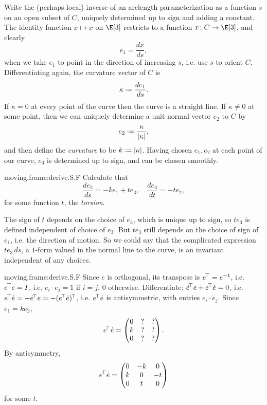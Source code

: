 Write the (perhaps local) inverse of an arclength parameterization as a function \(s\) on an open subset of \(C\), uniquely determined up to sign and adding a constant.
The identity function \(x \mapsto x\) on \(\E[3]\) restricts to a function \(x \colon C \to \E[3]\), and clearly
\[
e_1 = \frac{dx}{ds},
\]
when we take \(e_1\) to point in the direction of increasing \(s\), i.e. use \(s\) to orient \(C\).
Differentiating again, the curvature vector of \(C\) is 
\[
\kappa \defeq \frac{de_1}{ds}.
\]
If \(\kappa = 0\) at every point of the curve then the curve is a straight line.
If \(\kappa \ne 0\) at some point, then we can uniquely determine a unit normal vector \(e_2\) to \(C\) by
\[
e_2 \defeq \frac{\kappa}{\norm{\kappa}},
\]
and then define the \emph{curvature} to be \(k\defeq \norm{\kappa}\).
Having chosen \(e_1,e_2\) at each point of our curve, \(e_3\) is determined up to sign, and can be chosen smoothly.
\begin{problem}{moving.frame:derive.S.F}
Calculate that
\[
\frac{de_2}{ds}  = - k e_1 + t e_3, \quad \frac{de_3}{dt} = -te_2,
\]
for some function \(t\),  the \emph{torsion}.
\end{problem}
The sign of \(t\) depends on the choice of \(e_3\), which is unique up to sign, so \(te_3\) is defined independent of choice of \(e_3\).
But \(te_3\) still depends on the choice of sign of \(e_1\), i.e. the direction of motion.
So we could say that the complicated expression \(te_3 \, ds\), a \(1\)-form valued in the normal line to the curve, is an invariant independent of any choices.
\begin{answer}{moving.frame:derive.S.F}
Since \(e\) is orthogonal, its transpose is \(e^{\!\top}=e^{-1}\), i.e. \(e^{\!\top}e=I\), i.e. \(e_i \cdot e_j=1\) if \(i=j\), \(0\) otherwise.
Differentiate: \(\dot{e}^{\!\top} e + e^{\!\top} \dot{e}=0\), i.e. \(e^{\!\top}\dot{e}=-\dot{e}^{\!\top}e=-(e^{\!\top}\dot{e})^{\!\top}\), i.e. \(e^{\!\top}\dot{e}\) is antisymmetric, with entries \(e_i \cdot \dot{e}_j\).
Since \(\dot{e}_1=ke_2\),
\[
e^{\!\top}\dot{e}=
\begin{pmatrix}
0 & ? & ? \\
k & ? & ? \\
0 & ? & ?
\end{pmatrix}.
\]
By antisymmetry,
\[
e^{\!\top}\dot{e}=
\begin{pmatrix}
0 & -k & 0 \\
k & 0 & -t \\
0 & t & 0
\end{pmatrix}
\]
for some \(t\).
\end{answer}
